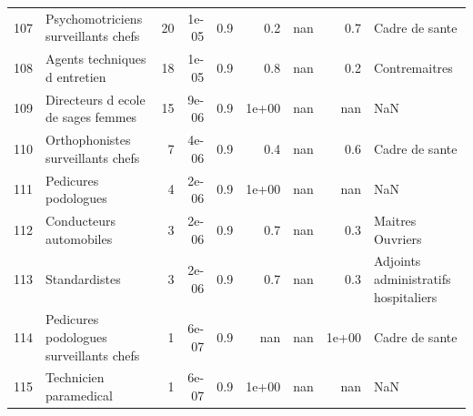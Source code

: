 \documentclass[11pt,a4paper]{article}
\begin{document}
\begin{tabular}{llrrrrrrl}
	107 &                Psychomotriciens surveillants chefs &             20 &          1e-05 &                    0.9 &                0.2 &                               nan &                                      0.7 &                                     Cadre de sante \\
	108 &                      Agents techniques d entretien &             18 &          1e-05 &                    0.9 &                0.8 &                               nan &                                      0.2 &                                      Contremaitres \\
	109 &                 Directeurs d ecole de sages femmes &             15 &          9e-06 &                    0.9 &              1e+00 &                               nan &                                      nan &                                                NaN \\
	110 &                  Orthophonistes surveillants chefs &              7 &          4e-06 &                    0.9 &                0.4 &                               nan &                                      0.6 &                                     Cadre de sante \\
	111 &                               Pedicures podologues &              4 &          2e-06 &                    0.9 &              1e+00 &                               nan &                                      nan &                                                NaN \\
	112 &                            Conducteurs automobiles &              3 &          2e-06 &                    0.9 &                0.7 &                               nan &                                      0.3 &                                   Maitres Ouvriers \\
	113 &                                      Standardistes &              3 &          2e-06 &                    0.9 &                0.7 &                               nan &                                      0.3 &               Adjoints administratifs hospitaliers \\
	114 &            Pedicures podologues surveillants chefs &              1 &          6e-07 &                    0.9 &                nan &                               nan &                                    1e+00 &                                     Cadre de sante \\
	115 &                             Technicien paramedical &              1 &          6e-07 &                    0.9 &              1e+00 &                               nan &                                      nan &                                                NaN \\
	\bottomrule
\end{tabular}
\end{document}
